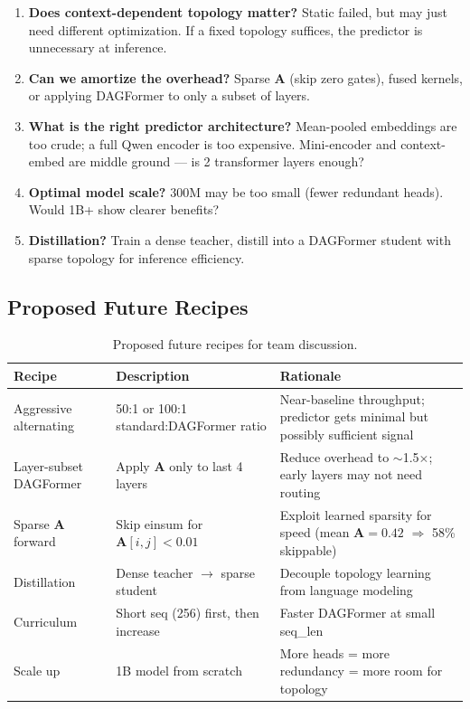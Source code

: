 \documentclass[11pt,a4paper]{article}
\newcommand{\A}{\mathbf{A}}
\begin{document}
\begin{enumerate}[nosep]
\item \textbf{Does context-dependent topology matter?} Static failed, but may just need different optimization. If a fixed topology suffices, the predictor is unnecessary at inference.
\item \textbf{Can we amortize the overhead?} Sparse $\A$ (skip zero gates), fused kernels, or applying DAGFormer to only a subset of layers.
\item \textbf{What is the right predictor architecture?} Mean-pooled embeddings are too crude; a full Qwen encoder is too expensive. Mini-encoder and context-embed are middle ground --- is 2 transformer layers enough?
\item \textbf{Optimal model scale?} 300M may be too small (fewer redundant heads). Would 1B+ show clearer benefits?
\item \textbf{Distillation?} Train a dense teacher, distill into a DAGFormer student with sparse topology for inference efficiency.
\end{enumerate}

\subsection{Proposed Future Recipes}

\begin{table}[H]
\centering
\small
\begin{tabularx}{\textwidth}{lXX}
\toprule
\textbf{Recipe} & \textbf{Description} & \textbf{Rationale} \\
\midrule
Aggressive alternating & 50:1 or 100:1 standard:DAGFormer ratio & Near-baseline throughput; predictor gets minimal but possibly sufficient signal \\
Layer-subset DAGFormer & Apply $\A$ only to last 4 layers & Reduce overhead to $\sim$1.5$\times$; early layers may not need routing \\
Sparse $\A$ forward & Skip einsum for $\A[i,j] < 0.01$ & Exploit learned sparsity for speed (mean $\A = 0.42$ $\Rightarrow$ 58\% skippable) \\
Distillation & Dense teacher $\to$ sparse student & Decouple topology learning from language modeling \\
Curriculum & Short seq (256) first, then increase & Faster DAGFormer at small seq\_len \\
Scale up & 1B model from scratch & More heads = more redundancy = more room for topology \\
\bottomrule
\end{tabularx}
\caption{Proposed future recipes for team discussion.}
\label{tab:recipes}
\end{table}
\end{document}
